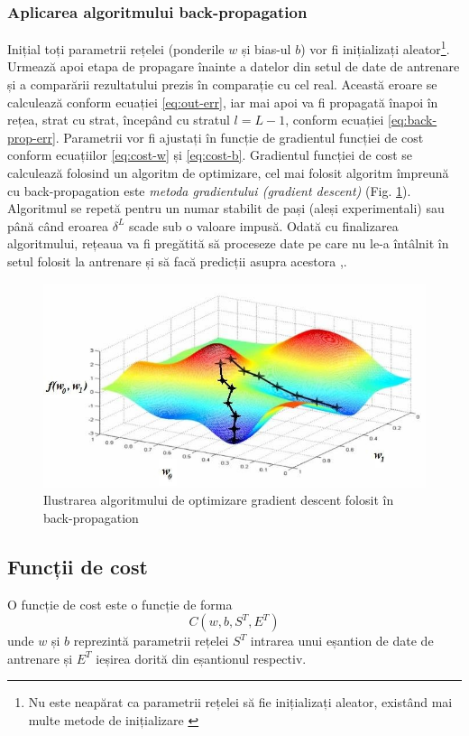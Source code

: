 \subsubsection*{Aplicarea algoritmului back-propagation}
Inițial toți parametrii rețelei (ponderile $w$ și bias-ul $b$) vor fi inițializați aleator\footnote{Nu este neapărat ca parametrii rețelei să fie inițializați aleator, existând mai multe metode de inițializare \cite{online:weight-init-cnn}}. Urmează apoi etapa de propagare înainte a datelor din setul de date de antrenare și a comparării rezultatului prezis în comparație cu cel real. Această eroare se calculează conform ecuației \eqref{eq:out-err}, iar mai apoi va fi propagată înapoi în rețea, strat cu strat, începând cu stratul $l = L-1$, conform ecuației \eqref{eq:back-prop-err}. Parametrii vor fi ajustați în funcție de gradientul funcției de cost conform ecuațiilor \eqref{eq:cost-w} și \eqref{eq:cost-b}. Gradientul funcției de cost se calculează folosind un algoritm de optimizare, cel mai folosit algoritm împreună cu back-propagation este \textit{metoda gradientului (gradient descent)} (Fig. \ref{fig:grad-desc}). Algoritmul se repetă pentru un numar stabilit de pași (aleși experimentali) sau până când eroarea $\delta^L$ scade sub o valoare impusă. Odată cu finalizarea algoritmului, rețeaua va fi pregătită să proceseze date pe care nu le-a întâlnit în setul folosit la antrenare și să facă predicții asupra acestora \cite{neuralnetbook:2015},\cite{vrejoiu:2019}.
\begin{figure}[ht]
\centering
\includegraphics[width=12cm, keepaspectratio]{fig/cap2/grad-desc.jpg}
\caption{Ilustrarea algoritmului de optimizare gradient descent folosit în back-propagation \cite{vrejoiu:2019}}
\label{fig:grad-desc}
\end{figure}

\subsection{Funcții de cost}\label{subsec:f-cost}
O funcție de cost este o funcție de forma \cite{neuralnetbook:2015}
\begin{equation}
C(w,b,S^T,E^T)
\label{eq:cost-form}
\end{equation}
unde $w$ și $b$ reprezintă parametrii rețelei $S^T$ intrarea unui eșantion de date de antrenare și $E^T$ ieșirea dorită din eșantionul respectiv.

